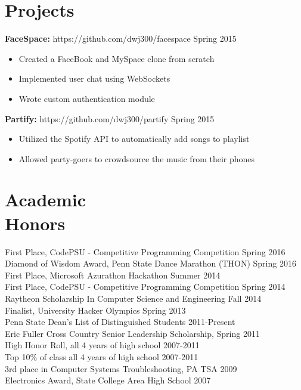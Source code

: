 \documentclass[margin]{res}
\begin{document}
\begin{resume}
\section{Projects}
{\bf FaceSpace:} https://github.com/dwj300/facespace \hfill Spring 2015
\begin{itemize} \itemsep -2pt %
\item Created a FaceBook and MySpace clone from scratch
\item Implemented user chat using WebSockets
\item Wrote custom authentication module
\end{itemize}
{\bf Partify:} https://github.com/dwj300/partify \hfill Spring 2015    
\begin{itemize} \itemsep -2pt %
\item Utilized the Spotify API to automatically add songs to playlist
\item Allowed party-goers to crowdsource the music from their phones
\end{itemize}

\section{Academic \\ Honors}
First Place, CodePSU - Competitive Programming Competition  \hfill Spring 2016\\
Diamond of Wisdom Award, Penn State Dance Marathon (THON) \hfill Spring 2016\\
First Place, Microsoft Azurathon Hackathon \hfill Summer 2014\\
First Place, CodePSU - Competitive Programming Competition  \hfill Spring 2014\\
Raytheon Scholarship In Computer Science and Engineering \hfill Fall 2014\\
Finalist, University Hacker Olympics \hfill Spring 2013\\
Penn State Dean's List of Distinguished Students \hfill 2011-Present \\
Eric Fuller Cross Country Senior Leadership Scholarship, \hfill Spring 2011 \\
High Honor Roll, all 4 years of high school \hfill 2007-2011 \\
Top 10\% of class all 4 years of high school \hfill 2007-2011 \\
3rd place in Computer Systems Troubleshooting, PA TSA \hfill 2009 \\
Electronics Award, State College Area High School \hfill 2007


\end{resume}
\end{document}
